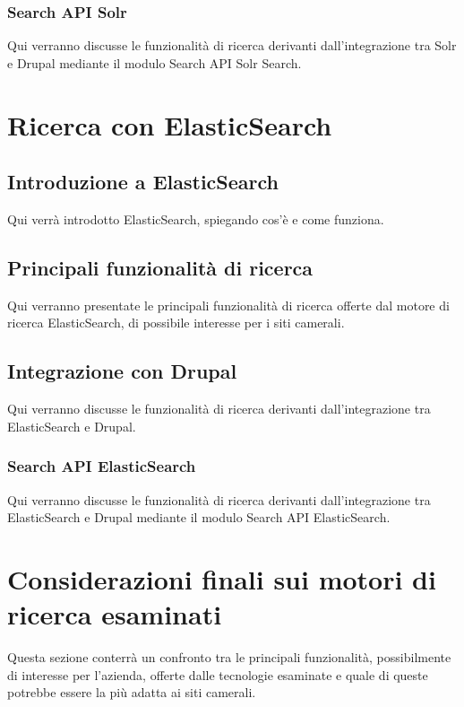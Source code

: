 			\subsubsection{Search API Solr}
			Qui verranno discusse le funzionalità di ricerca derivanti dall'integrazione tra Solr e Drupal mediante il modulo Search API Solr Search.
	
	\section{Ricerca con ElasticSearch}
	
		\subsection{Introduzione a ElasticSearch}
		Qui verrà introdotto ElasticSearch, spiegando cos'è e come funziona.

		\subsection{Principali funzionalità di ricerca}
		Qui verranno presentate le principali funzionalità di ricerca offerte dal motore di ricerca ElasticSearch, di possibile interesse per i siti camerali.
		
		\subsection{Integrazione con Drupal}
		Qui verranno discusse le funzionalità di ricerca derivanti dall'integrazione tra ElasticSearch e Drupal.
		
			\subsubsection{Search API ElasticSearch}
			Qui verranno discusse le funzionalità di ricerca derivanti dall'integrazione tra ElasticSearch e Drupal mediante il modulo Search API ElasticSearch.
			
	\section{Considerazioni finali sui motori di ricerca esaminati}
	Questa sezione conterrà un confronto tra le principali funzionalità, possibilmente di interesse per l'azienda, offerte dalle tecnologie esaminate e quale di queste potrebbe essere la più adatta ai siti camerali.